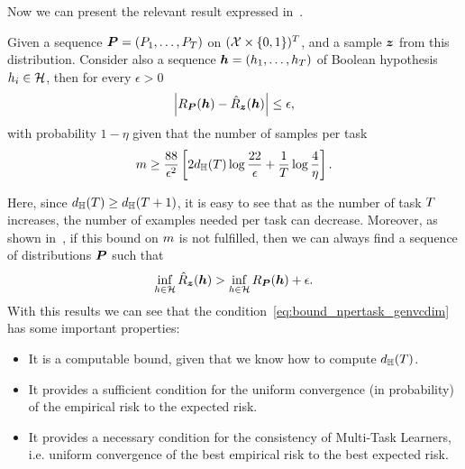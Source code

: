 Now we can present the relevant result expressed in~\cite[Corollary~13]{baxter2000model}.
\begin{theorem}\label{th:baxter_vcdim}
    Given a sequence $\bm{P} = (P_1, \ldots, P_T)$ on $(\mathcal{X} \times \left\{0, 1\right\})^T$, and a sample $\bm{z}$ from this distribution. Consider also a sequence $\bm{h} = (h_1, \ldots, h_T)$ of Boolean hypothesis $h_i \in \mathcal{H}$, then for every $\epsilon > 0$
\begin{equation}
    \nonumber
    \left|R_{\bm{P}}(\bm{h}) - \hat{R}_{\bm{z}}(\bm{h})\right| \leq \epsilon,
\end{equation}
with probability $1 - \eta$ given that the number of samples per task
\begin{equation}
    \label{eq:bound_npertask_genvcdim}
    \npertask \geq \frac{88}{\epsilon^2} \left[2 d_\hypspacef(\ntasks) \log \frac{22}{\epsilon} + \frac{1}{\ntasks}\log\frac{4}{\eta} \right] .
\end{equation}
\end{theorem}
Here, since $d_{\mathbb{H}}(T) \geq d_{\mathbb{H}}(T+1)$, it is easy to see that as the number of task $T$ increases, the number of examples needed per task can decrease. 
Moreover, as shown in~\cite[Theorem~14]{baxter2000model}, if this bound on $m$ is not fulfilled, then we can always find a sequence of distributions $\bm{P}$ such that
\begin{equation}
    \nonumber
    \inf_{h \in \mathcal{H}} \hat{R}_{\bm{z}}(\bm{h}) > \inf_{h \in \mathcal{H}} R_{\bm{P}}(\bm{h}) + \epsilon .
\end{equation}
With this results we can see that the condition~\eqref{eq:bound_npertask_genvcdim} has some important properties:
\begin{itemize}
    \item It is a computable bound, given that we know how to compute $d_{\mathbb{H}}(T)$.
    \item It provides a sufficient condition for the uniform convergence (in probability) of the empirical risk to the expected risk.
    \item It provides a necessary condition for the consistency of Multi-Task Learners, i.e. uniform convergence of the best empirical risk to the best expected risk.
\end{itemize}

